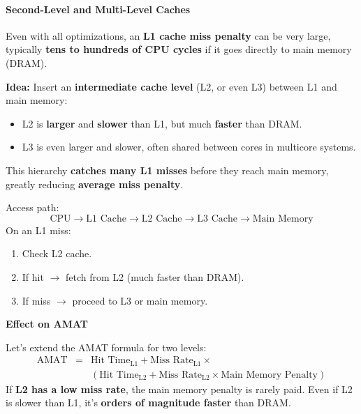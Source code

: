 \paragraph{Second-Level and Multi-Level Caches}\label{paragraph: Second-Level and Multi-Level Caches}

Even with all optimizations, an \textbf{L1 cache miss penalty} can be very large, typically \textbf{tens to hundreds of CPU cycles} if it goes directly to main memory (DRAM).

\highspace
\textbf{Idea:} Insert an \textbf{intermediate cache level} (L2, or even L3) between L1 and main memory:
\begin{itemize}
    \item L2 is \textbf{larger} and \textbf{slower} than L1, but much \textbf{faster} than DRAM.
    \item L3 is even larger and slower, often shared between cores in multicore systems.
\end{itemize}
This hierarchy \textbf{catches many L1 misses} before they reach main memory, greatly reducing \textbf{average miss penalty}.

\highspace
Access path:
\begin{equation*}
    \text{CPU} \rightarrow \text{L1 Cache} \rightarrow \text{L2 Cache} \rightarrow \text{L3 Cache} \rightarrow \text{Main Memory}
\end{equation*}
On an L1 miss:
\begin{enumerate}
    \item Check L2 cache.
    \item If hit $\rightarrow$ fetch from L2 (much faster than DRAM).
    \item If miss $\rightarrow$ proceed to L3 or main memory.
\end{enumerate}

\highspace
\begin{flushleft}
    \textcolor{Green3}{ \textbf{Effect on AMAT}}
\end{flushleft}
Let's extend the AMAT formula for two levels:
\begin{equation}
    \begin{array}{rcl}
        \text{AMAT} &=& \text{Hit Time}_{\text{L1}} + \text{Miss Rate}_{\text{L1}} \times \\ [.3em]
        && \left(\text{Hit Time}_{\text{L2}} + \text{Miss Rate}_{\text{L2}} \times \text{Main Memory Penalty}\right)
    \end{array}
\end{equation}
If \textbf{L2 has a low miss rate}, the main memory penalty is rarely paid. Even if L2 is slower than L1, it's \textbf{orders of magnitude faster} than DRAM.

